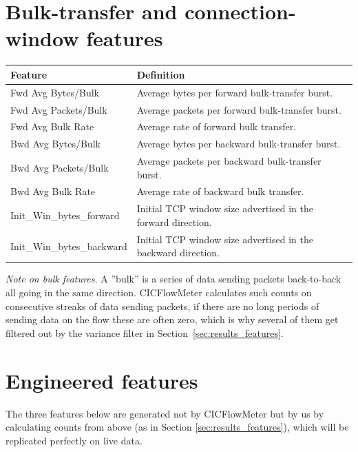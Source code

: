 \section{Bulk-transfer and connection-window features}
\label{app:feat_bulk}

\begin{tabularx}{\textwidth}{lX}
  \toprule
  \textbf{Feature} & \textbf{Definition} \\
  \midrule
  Fwd Avg Bytes/Bulk    & Average bytes per forward bulk-transfer burst. \\
  Fwd Avg Packets/Bulk  & Average packets per forward bulk-transfer burst. \\
  Fwd Avg Bulk Rate     & Average rate of forward bulk transfer. \\
  Bwd Avg Bytes/Bulk    & Average bytes per backward bulk-transfer burst. \\
  Bwd Avg Packets/Bulk  & Average packets per backward bulk-transfer burst. \\
  Bwd Avg Bulk Rate     & Average rate of backward bulk transfer. \\
  Init\_Win\_bytes\_forward   & Initial TCP window size advertised in the forward direction. \\
  Init\_Win\_bytes\_backward  & Initial TCP window size advertised in the backward direction. \\
  \bottomrule
\end{tabularx}

\vspace{1em}

\noindent\textit{Note on bulk features.} A ”bulk” is a series of data sending packets back-to-back all going in the same direction. CICFlowMeter calculates such counts on consecutive streaks of data sending packets, if there are no long periods of sending data on the flow these are often zero, which is why several of them get filtered out by the variance filter in Section~\ref{sec:results_features}.

\section{Engineered features}
\label{app:feat_engineered}

The three features below are generated not by CICFlowMeter but by us by calculating counts from above (as in Section \ref{sec:results_features}), which will be replicated perfectly on live data.


